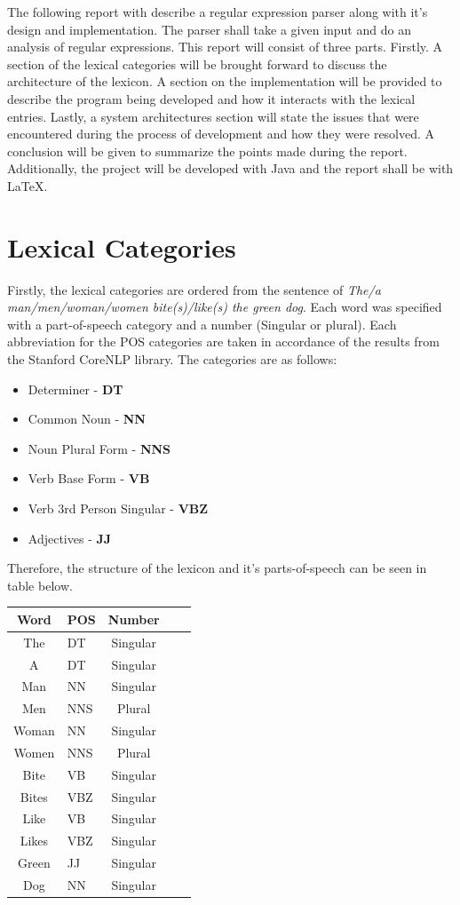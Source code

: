 The following report with describe a regular expression parser along with it's design and implementation. The parser shall take a given input and do an analysis of regular expressions. This report will consist of three parts. Firstly. A section of the lexical categories will be brought forward to discuss the architecture of the lexicon. A section on the implementation will be provided to describe the program being developed and how it interacts with the lexical entries. Lastly, a system architectures section will state the issues that were encountered during the process of development and how they were resolved. A conclusion will be given to summarize the points made during the report. Additionally, the project will be developed with Java and the report shall be with LaTeX.

\section*{Lexical Categories}
Firstly, the lexical categories are ordered from the sentence of \textit{The/a man/men/woman/women bite(s)/like(s) the green dog}. Each word was specified with a part-of-speech category and a number (Singular or plural). Each abbreviation for the POS categories are taken in accordance of the results from the Stanford CoreNLP library. The categories are as follows:
\newpage
\begin{itemize}
	\item Determiner - \textbf{DT}
	\item Common Noun - \textbf{NN}
	\item Noun Plural Form - \textbf{NNS}
	\item Verb Base Form - \textbf{VB}
	\item Verb 3rd Person Singular - \textbf{ VBZ}
	\item Adjectives - \textbf{JJ}
\end{itemize}
Therefore, the structure of the lexicon and it's parts-of-speech can be seen in table below.


\begin{longtable}{|c|p{2cm}|c|c|c|}
	\hline 
	\textbf{Word}
	& \textbf{POS}
	& \textbf{Number}
	\\ 
	\hline 
	The & DT & Singular \\ 
	\hline 
	A  & DT & Singular \\ 
	\hline 
	Man & NN & Singular \\ 
	\hline 
	Men & NNS & Plural \\ 
	\hline 
	Woman & NN & Singular \\ 
	\hline 
	Women & NNS & Plural \\ 
	\hline 
	Bite & VB & Singular \\ 
	\hline 
	Bites & VBZ & Singular \\ 
	\hline 
	Like & VB & Singular \\ 
	\hline 
	Likes & VBZ & Singular \\ 
	\hline 
	Green & JJ & Singular \\ 
	\hline 
	Dog & NN  & Singular \\ 
	\hline 
\end{longtable}





